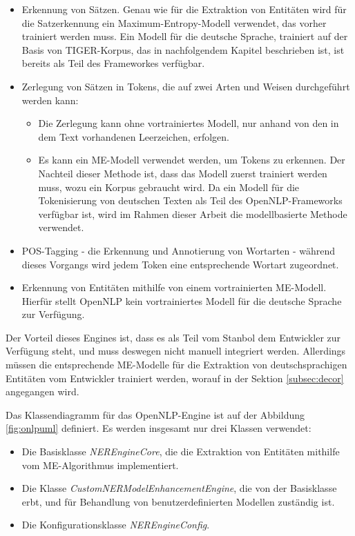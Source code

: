 \begin{itemize}
\item Erkennung von Sätzen. Genau wie für die Extraktion von Entitäten wird für die Satzerkennung ein Maximum-Entropy-Modell verwendet, das vorher trainiert werden muss. Ein Modell für die deutsche Sprache, trainiert auf der Basis von TIGER-Korpus, das in nachfolgendem Kapitel beschrieben ist, ist bereits als Teil des Frameworkes verfügbar.
\item Zerlegung von Sätzen in Tokens, die auf zwei Arten und Weisen durchgeführt werden kann:
\begin{itemize}
\item Die Zerlegung kann ohne vortrainiertes Modell, nur anhand von den in dem Text vorhandenen Leerzeichen, erfolgen.
\item Es kann ein ME-Modell verwendet werden, um Tokens zu erkennen. Der Nachteil dieser Methode ist, dass das Modell zuerst trainiert werden muss, wozu ein Korpus gebraucht wird. Da ein Modell für die Tokenisierung von deutschen Texten als Teil des OpenNLP-Frameworks verfügbar ist, wird im Rahmen dieser Arbeit die modellbasierte Methode verwendet.
\end{itemize}
\item POS-Tagging - die Erkennung und Annotierung von Wortarten - während dieses Vorgangs wird jedem Token eine entsprechende Wortart zugeordnet.
\item Erkennung von Entitäten mithilfe von einem vortrainierten ME-Modell. Hierfür stellt OpenNLP kein vortrainiertes Modell für die deutsche Sprache zur Verfügung.
\end{itemize}

Der Vorteil dieses Engines ist, dass es als Teil vom Stanbol dem Entwickler zur Verfügung steht, und muss deswegen nicht manuell integriert werden. Allerdings müssen die entsprechende ME-Modelle für die Extraktion von deutschsprachigen Entitäten vom Entwickler trainiert werden, worauf in der Sektion \ref{subsec:decor} angegangen wird.

Das Klassendiagramm für das OpenNLP-Engine ist auf der Abbildung \ref{fig:onlpuml} definiert. Es werden insgesamt nur drei Klassen verwendet:
\begin{itemize}
\item Die Basisklasse \textit{NEREngineCore}, die die Extraktion von Entitäten mithilfe vom ME-Algorithmus implementiert.
\item Die Klasse \textit{CustomNERModelEnhancementEngine}, die von der Basisklasse erbt, und für Behandlung von benutzerdefinierten Modellen zuständig ist.
\item Die Konfigurationsklasse \textit{NEREngineConfig}.
\end{itemize}

